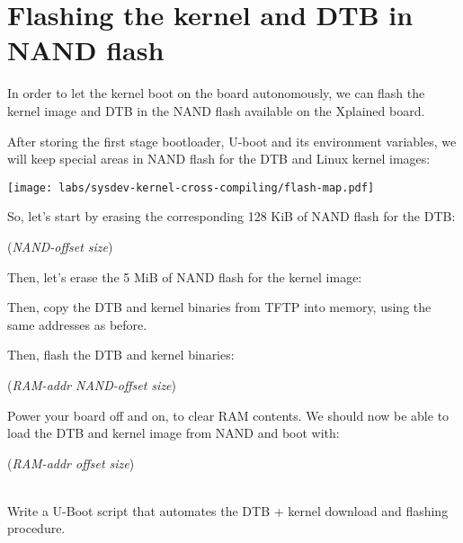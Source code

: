 {
\section{Flashing the kernel and DTB in NAND flash}

In order to let the kernel boot on the board autonomously, we can
flash the kernel image and DTB in the NAND flash available on the
Xplained board.

After storing the first stage bootloader, U-boot and its environment
variables, we will keep special areas in NAND flash for the DTB
and Linux kernel images:

\begin{center}
  \texttt{[image: labs/sysdev-kernel-cross-compiling/flash-map.pdf]}
\end{center}

So, let's start by erasing the corresponding 128 KiB of NAND flash
for the DTB:


 ({\em NAND-offset size})

Then, let's erase the 5 MiB of NAND flash for the kernel image:


Then, copy the DTB and kernel binaries from TFTP into memory, using the
same addresses as before.

Then, flash the DTB and kernel binaries:

 ({\em RAM-addr NAND-offset size})\\

Power your board off and on, to clear RAM contents. We should now be
able to load the DTB and kernel image from NAND and boot with:

 ({\em RAM-addr offset size})\\
\\

Write a U-Boot script that automates the DTB + kernel download
and flashing procedure.

}
